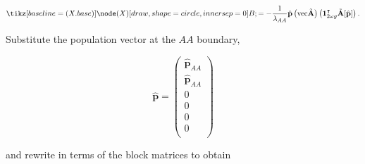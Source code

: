 \documentclass[11pt]{article}
\newcommand\encircle[1]{%
  \tikz[baseline=(X.base)] 
    \node (X) [draw, shape=circle, inner sep=0] {\strut #1};}
\def\mbf#1{\mathbf{#1}}
\begin{document}
\begin{landscape}

\begin{equation}
	\encircle{B} = - \frac{1}{\lambda_{AA}} \hat{\mbf{p}} \left( \text{vec} \tilde{\mbf{A}} \right) \left( \mbf{1}^{\intercal}_{2 \omega g} \tilde{\mbf{A}}[\hat{\mbf{p}}] \right).
\end{equation}

\noindent Substitute the population vector at the $AA$ boundary,

\begin{equation}
	\hat{\mbf{p}} = \left(
			\begin{array}{c}
							\hat{\mbf{p}}_{AA} \\
							\hat{\mbf{p}}_{AA} \\ \hline
							0                  \\
							0                  \\ \hline
							0                  \\
							0                  \\
			\end{array} \right)
\end{equation}

\noindent and rewrite in terms of the block matrices to obtain


\end{landscape}
\end{document}

